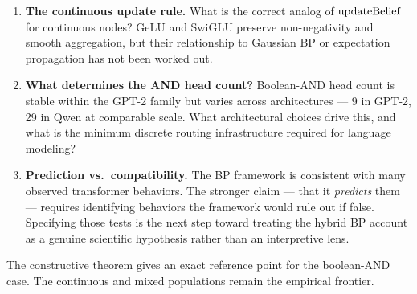 \begin{enumerate}
\item \textbf{The continuous update rule.} What is the correct analog of $\mathrm{updateBelief}$ for continuous nodes? GeLU and SwiGLU preserve non-negativity and smooth aggregation, but their relationship to Gaussian BP or expectation propagation has not been worked out.

\item \textbf{What determines the AND head count?} Boolean-AND head count is stable within the GPT-2 family but varies across architectures --- 9 in GPT-2, 29 in Qwen at comparable scale. What architectural choices drive this, and what is the minimum discrete routing infrastructure required for language modeling?

\item \textbf{Prediction vs.\ compatibility.} The BP framework is consistent with many observed transformer behaviors. The stronger claim --- that it \emph{predicts} them --- requires identifying behaviors the framework would rule out if false. Specifying those tests is the next step toward treating the hybrid BP account as a genuine scientific hypothesis rather than an interpretive lens.
\end{enumerate}

The constructive theorem gives an exact reference point for the boolean-AND case. The continuous and mixed populations remain the empirical frontier.